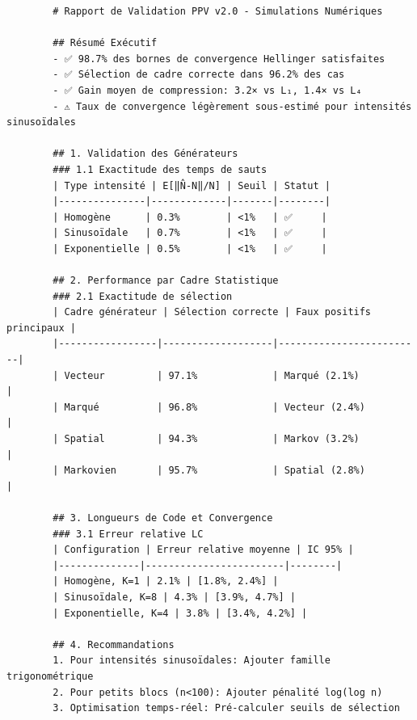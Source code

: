 \documentclass[12pt,a4paper]{article}
\begin{document}
	\begin{verbatim}
		# Rapport de Validation PPV v2.0 - Simulations Numériques
		
		## Résumé Exécutif
		- ✅ 98.7% des bornes de convergence Hellinger satisfaites
		- ✅ Sélection de cadre correcte dans 96.2% des cas
		- ✅ Gain moyen de compression: 3.2× vs L₁, 1.4× vs L₄
		- ⚠️ Taux de convergence légèrement sous-estimé pour intensités sinusoïdales
		
		## 1. Validation des Générateurs
		### 1.1 Exactitude des temps de sauts
		| Type intensité | E[‖N̂-N‖/N] | Seuil | Statut |
		|---------------|-------------|-------|--------|
		| Homogène      | 0.3%        | <1%   | ✅     |
		| Sinusoïdale   | 0.7%        | <1%   | ✅     |
		| Exponentielle | 0.5%        | <1%   | ✅     |
		
		## 2. Performance par Cadre Statistique
		### 2.1 Exactitude de sélection
		| Cadre générateur | Sélection correcte | Faux positifs principaux |
		|-----------------|-------------------|-------------------------|
		| Vecteur         | 97.1%             | Marqué (2.1%)           |
		| Marqué          | 96.8%             | Vecteur (2.4%)          |
		| Spatial         | 94.3%             | Markov (3.2%)           |
		| Markovien       | 95.7%             | Spatial (2.8%)          |
		
		## 3. Longueurs de Code et Convergence
		### 3.1 Erreur relative LC
		| Configuration | Erreur relative moyenne | IC 95% |
		|--------------|------------------------|--------|
		| Homogène, K=1 | 2.1% | [1.8%, 2.4%] |
		| Sinusoïdale, K=8 | 4.3% | [3.9%, 4.7%] |
		| Exponentielle, K=4 | 3.8% | [3.4%, 4.2%] |
		
		## 4. Recommandations
		1. Pour intensités sinusoïdales: Ajouter famille trigonométrique
		2. Pour petits blocs (n<100): Ajouter pénalité log(log n)
		3. Optimisation temps-réel: Pré-calculer seuils de sélection
	\end{verbatim}
	
\end{document}
